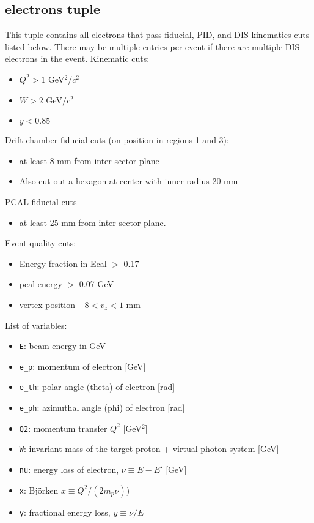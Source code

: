 \documentclass[english]{article}
\newcommand{\code}[1]{\texttt{#1}}
\begin{document}
\subsection{electrons tuple}
This tuple contains all electrons that pass fiducial, PID, and DIS kinematics cuts listed below.  There may be multiple entries per event if there are multiple DIS electrons in the event.
Kinematic cuts:
\begin{itemize}
\item $Q^2>1$ GeV$^2/c^2$
\item $W>2$ GeV$/c^2$
\item $y<0.85$
\end{itemize}
Drift-chamber fiducial cuts (on position in regions 1 and 3):
\begin{itemize}
\item at least 8 mm from inter-sector plane
\item Also cut out a hexagon at center with inner radius 20 mm
\end{itemize}
PCAL fiducial cuts
\begin{itemize}
\item at least 25 mm from inter-sector plane.
\end{itemize}
Event-quality cuts:
\begin{itemize}
\item Energy fraction in Ecal $>$ 0.17
\item pcal energy $>$ 0.07 GeV
\item vertex position $-8 < v_z < 1$ mm
\end{itemize}
List of variables:
\begin{itemize}
\item \code{E}:  beam energy in GeV
\item \code{e\_p}:  momentum of electron [GeV]
\item \code{e\_th}:  polar angle (theta) of electron [rad]
\item \code{e\_ph}:  azimuthal angle (phi) of electron [rad]
\item \code{Q2}:  momentum transfer $Q^2$ [GeV$^2$]
\item \code{W}:  invariant mass of the target proton + virtual photon system [GeV]
\item \code{nu}:  energy loss of electron, $\nu \equiv E-E'$ [GeV]
\item \code{x}:  Bj\" orken $x\equiv Q^2/(2m_p \nu)$)
\item \code{y}:  fractional energy loss, $y\equiv\nu/E$
\end{itemize}
\end{document}
